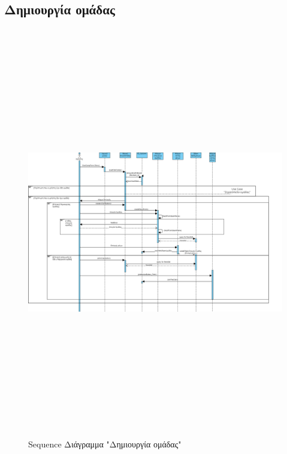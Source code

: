 \subsection{Δημιουργία ομάδας}
\begin{figure}[!htb]
\begin{center}
    \includegraphics[width=\textwidth,height=18cm]{sequence_dhmiourgia.png}
    \caption{Sequence Διάγραμμα "Δημιουργία ομάδας"}
    \label{}
    \end{center}
\end{figure}
\newpage

